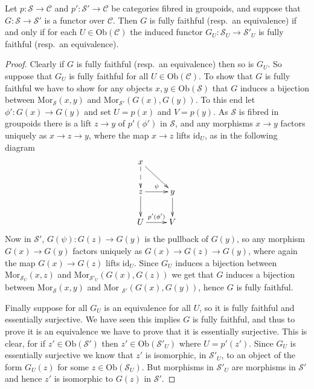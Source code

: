 \begin{lemma}
\label{lemma-equivalence-fibred-categories}
Let $p\colon \mathcal{S}\to \mathcal{C}$ and 
$p'\colon \mathcal{S'}\to \mathcal{C}$ be categories fibred in groupoids, and
suppose that $G\colon \mathcal{S}\to \mathcal {S}'$ is a functor over 
$\mathcal{C}$.  Then $G$ is fully faithful (resp.\ an equivalence) if and only
if for each $U\in\text{Ob}(\mathcal{C})$ the induced functor 
$G_U\colon \mathcal{S}_U\to \mathcal{S}'_U$ is fully faithful (resp.\ an
equivalence).
\end{lemma}

\begin{proof}
Clearly if $G$ is fully faithful (resp.\ an equivalence) then so is $G_U$. So
suppose that $G_U$ is fully faithful for all $U\in\text{Ob}(\mathcal C)$. To
show that $G$ is fully faithful we have to show for any objects
$x,y\in\text{Ob}(\mathcal{S})$ that $G$ induces a bijection between
$\text{Mor}_{\mathcal{S}}(x,y)$ and $\text{Mor}_{\mathcal{S}'}(G(x),G(y))$. 
To this end let $\phi'\colon G(x)\to G(y)$ and set $U=p(x)$ and $V=p(y)$.
As $\mathcal{S}$ is fibred in groupoids there is a lift $z\to y$ of 
$p'(\phi')$ in $\mathcal{S}$, and any morphisms $x\to y$ factors uniquely
as $x\to z\to y$, where the map $x\to z$ lifts $\text{id}_U$, as in the
following diagram
$$
\xymatrix{
x \ar@{-->}[d] \ar[rd]  \\
z \ar[r]^\psi \ar[d] & y \ar[d] \\
U \ar[r]^{p'(\phi')} &V}
$$ 
Now in $\mathcal{S}'$,  $G(\psi)\colon G(z)\to G(y)$ is the pullback of
$G(y)$, so any morphism $G(x)\to G(y)$ factors uniquely
as $G(x)\to G(z)\to G(y)$, where again the map
$G(x)\to G(z)$ lifts $\text{id}_U$.  Since $G_U$
induces a bijection between $\text{Mor}_{\mathcal{S}_U}(x,z)$ and
$\text{Mor}_{\mathcal{S}'_U}(G(x),G(z))$ we get that
$G$ induces a bijection between $\text{Mor}_{\mathcal{S}}(x,y)$
and $\text{Mor }_{\mathcal{S}'}(G(x),G(y))$, hence $G$
is fully faithful.

\medskip\noindent
Finally suppose for all $G_U$ is an equivalence for all $U$, so it is
fully faithful and essentially surjective.  We have seen this implies $G$ is
fully faithful, and thus to prove it is an equivalence we have to prove that
it is essentially surjective.  This is clear, for if $z'\in
\text{Ob}(\mathcal{S}')$ then $z'\in \text{Ob}(\mathcal{S}'_U)$ where
$U=p'(z')$.  Since $G_U$ is essentially surjective we know that
$z'$ is isomorphic, in $\mathcal{S}'_U$, to an object of the form
$G_U(z)$ for some $z\in \text{Ob}(\mathcal{S}_U)$.  But morphisms
in $\mathcal{S}'_U$ are morphisms in $\mathcal{S}'$ and hence $z'$ is
isomorphic to $G(z)$ in $\mathcal{S}'$.
\end{proof}

